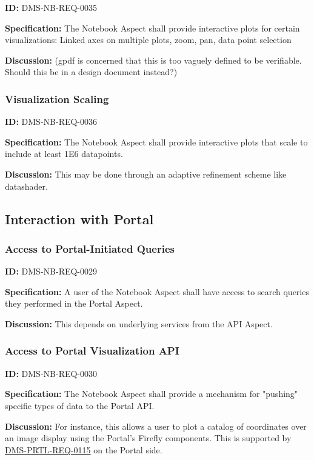 \documentclass[SE,toc]{lsstdoc}
\begin{document}
\label{DMS-NB-REQ-0035}
\textbf{ID:} DMS-NB-REQ-0035

\textbf{Specification:}
The Notebook Aspect shall provide interactive plots for certain visualizations:
Linked axes on multiple plots, zoom, pan, data point selection

\textbf{Discussion:}
(gpdf is concerned that this is too vaguely defined to be verifiable.  Should this be in a design document instead?)

\subsubsection{Visualization Scaling}

\label{DMS-NB-REQ-0036}
\textbf{ID:} DMS-NB-REQ-0036

\textbf{Specification:}
The Notebook Aspect shall provide interactive plots that scale to include at least 1E6 datapoints.

\textbf{Discussion:}
This may be done through an adaptive refinement scheme like datashader.

\subsection{Interaction with Portal}

\subsubsection{Access to Portal-Initiated Queries}

\label{DMS-NB-REQ-0029}
\textbf{ID:} DMS-NB-REQ-0029

\textbf{Specification:}
A user of the Notebook Aspect shall have access to search queries they performed in the Portal Aspect.

\textbf{Discussion:}
This depends on underlying services from the API Aspect.

\subsubsection{Access to Portal Visualization API}

\label{DMS-NB-REQ-0030}
\textbf{ID:} DMS-NB-REQ-0030

\textbf{Specification:}
The Notebook Aspect shall provide a mechanism for "pushing" specific types of data to the Portal API.

\textbf{Discussion:}
For instance, this allows a user to plot a catalog of coordinates over an image display using the Portal's Firefly components.  This is supported by \hyperref[DMS-PRTL-REQ-0115]{DMS-PRTL-REQ-0115} on the Portal side.
\end{document}
